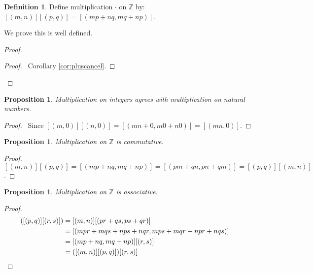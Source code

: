 \documentclass{book}
\let\qed\relax
\newtheorem{prop}[ax]{Proposition}
\theoremstyle{definition}
\newtheorem{df}[ax]{Definition}
\begin{document}
\begin{df}
Define multiplication $\cdot$ on $\mathbb{Z}$ by: $[(m,n)][(p,q)] = [(mp+nq,mq+np)]$.

We prove this is well defined.
\end{df}

\begin{proof}
\pf
{}
\begin{proof}
	\pf\ Corollary \ref{cor:pluscancel}.
\end{proof}
\qed
\end{proof}

\begin{prop}
Multiplication on integers agrees with multiplication on natural numbers.
\end{prop}

\begin{proof}
\pf\ Since $[(m,0)][(n,0)] = [(mn+0,m0+n0)] = [(mn,0)]$. \qed
\end{proof}

\begin{prop}
\label{prop:timesZcomm}
Multiplication on $\mathbb{Z}$ is commutative.
\end{prop}

\begin{proof}
\pf\ $[(m,n)][(p,q)] = [(mp+nq,mq+np)] = [(pm+qn,pn+qm)] = [(p,q)][(m,n)]$. \qed
\end{proof}

\begin{prop}
\label{prop:timesZassoc}
Multiplication on $\mathbb{Z}$ is associative.
\end{prop}

\begin{proof}
\pf
\begin{align*}
[(m,n)]([(p,q)][(r,s)]) & = [(m,n)][(pr+qs,ps+qr)] \\
& = [(mpr+mqs+nps+nqr,mps+mqr+npr+nqs)] \\
& = [(mp+nq,mq+np)][(r,s)] \\
& = ([(m,n)][(p,q)])[(r,s)] & \qed
\end{align*}
\end{proof}
\end{document}
